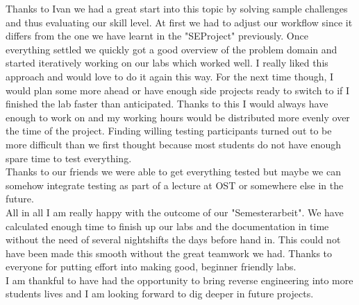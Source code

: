 Thanks to Ivan we had a great start into this topic by solving sample challenges and thus evaluating our skill level.
At first we had to adjust our workflow since it differs from the one we have learnt in the "SEProject" previously.
Once everything settled we quickly got a good overview of the problem domain and started iteratively working on our labs which worked well. 
I really liked this approach and would love to do it again this way. 
For the next time though, I would plan some more ahead or have enough side projects ready to switch to if I finished the lab faster than anticipated.
Thanks to this I would always have enough to work on and my working hours would be distributed more evenly over the time of the project.
Finding willing testing participants turned out to be more difficult than we first thought because most students do not have enough spare time to test everything. \\
Thanks to our friends we were able to get everything tested but maybe we can somehow integrate testing as part of a lecture at OST or somewhere else in the future.  \\
All in all I am really happy with the outcome of our "Semesterarbeit". 
We have calculated enough time to finish up our labs and the documentation in time without the need of several nightshifts the days before hand in.
This could not have been made this smooth without the great teamwork we had. Thanks to everyone for putting effort into making good, beginner friendly labs. \\
I am thankful to have had the opportunity to bring reverse engineering into more students lives and I am looking forward to dig deeper in future projects.
